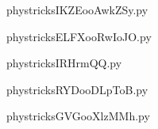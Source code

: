     

    \clearpage
    


    \newcommand{\CaptionFigIKZEooAwkZSy}{<+Type your caption here+>}
    \begin{center}
        
    \end{center}
    phystricksIKZEooAwkZSy.py

    

    \clearpage
    


    \newcommand{\CaptionFigELFXooRwIoJO}{<+Type your caption here+>}
    \begin{center}
        
    \end{center}
    phystricksELFXooRwIoJO.py

    

    \clearpage
    


    \newcommand{\CaptionFigIRHrmQQ}{<+Type your caption here+>}
    \begin{center}
        
    \end{center}
    phystricksIRHrmQQ.py

    

    \clearpage
    


    \newcommand{\CaptionFigRYDooDLpToB}{<+Type your caption here+>}
    \begin{center}
        
    \end{center}
    phystricksRYDooDLpToB.py

    

    \clearpage
    


    \newcommand{\CaptionFigGVGooXlzMMh}{<+Type your caption here+>}
    \begin{center}
        
    \end{center}
    phystricksGVGooXlzMMh.py

    

    \clearpage
    


